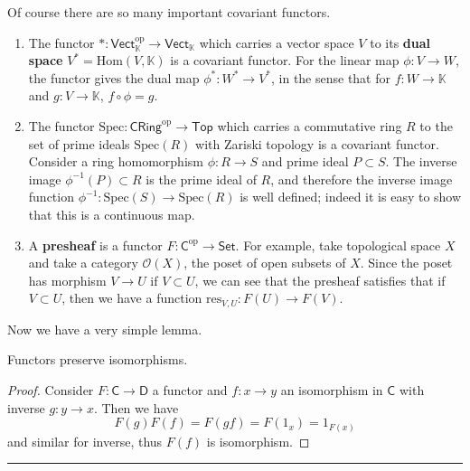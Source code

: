 \begin{exmp} Of course there are so many important covariant functors.
\begin{enumerate}
\item The functor $*:\mathsf{Vect}_{\mathbb{K}}^{\mathrm{op}}\rightarrow \mathsf{Vect}_{\mathbb{K}}$ which carries a vector space $V$ to its \textbf{dual space} $V^*=\textrm{Hom}(V,\mathbb{K})$ is a covariant functor. For the linear map $\phi:V\rightarrow W$, the functor gives the dual map $\phi^*:W^*\rightarrow V^*$, in the sense that for $f:W\rightarrow \mathbb{K}$ and $g:V\rightarrow \mathbb{K}$, $f\circ \phi=g$.
\item The functor $\mathrm{Spec}:\mathsf{CRing}^{\mathrm{op}}\rightarrow \mathsf{Top}$ which carries a commutative ring $R$ to the set of prime ideals $\mathrm{Spec}(R)$ with Zariski topology is a covariant functor. Consider a ring homomorphism $\phi:R\rightarrow S$ and prime ideal $P\subset S$. The inverse image $\phi^{-1}(P)\subset R$ is the prime ideal of $R$, and therefore the inverse image function $\phi^{-1}:\mathrm{Spec}(S)\rightarrow \mathrm{Spec}(R)$ is well defined; indeed it is easy to show that this is a continuous map.
\item A \textbf{presheaf} is a functor $F:\mathsf{C}^{\mathrm{op}}\rightarrow \mathsf{Set}$. For example, take topological space $X$ and take a category $\mathcal{O}(X)$, the poset of open subsets of $X$. Since the poset has morphism $V\rightarrow U$ if $V\subset U$, we can see that the presheaf satisfies that if $V\subset U$, then we have a function $\mathrm{res}_{V,U}:F(U)\rightarrow F(V)$.
\end{enumerate}
\end{exmp}
Now we have a very simple lemma.
\begin{lemma} Functors preserve isomorphisms.
\end{lemma}
\begin{proof} Consider $F:\mathsf{C}\rightarrow \mathsf{D}$ a functor and $f:x\rightarrow y$ an isomorphism in $\mathsf{C}$ with inverse $g:y\rightarrow x$. Then we have
\begin{equation}
F(g)F(f)=F(gf)=F(1_x)=1_{F(x)}
\end{equation}
and similar for inverse, thus $F(f)$ is isomorphism.
\end{proof}
\noindent\rule{\textwidth}{1pt}
\newline